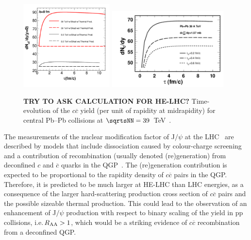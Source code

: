 \documentclass[../report.tex]{subfiles}
\begin{document}
\begin{figure}[!t]
\begin{center}
\includegraphics[width=0.42\textwidth]{helhc/figs/charmZhou.pdf}
\hfill
\includegraphics[width=0.54\textwidth]{helhc/figs/charmKo.pdf}
\caption{{\bf TRY TO ASK CALCULATION FOR HE-LHC?}  Time-evolution of the $c\overline c$ yield
  (per unit of rapidity at midrapidity) for central Pb--Pb collisions
  at $\sqrtsNN=39$~TeV~\cite{Zhou:2016wbo,Liu:2016zle}.}
\label{fig:thermalcharm}
\end{center}
\end{figure}




The measurements of the nuclear modification factor of J$/\psi$ at the LHC~\cite{Adam:2015isa,Adam:2015rba,Chatrchyan:2012np} 
are described by models that include dissociation caused by
colour-charge screening and a contribution of recombination
(usually denoted (re)generation) from deconfined $c$ and $\overline c$
quarks in the QGP~\cite{Liu:2009nb,Zhao:2011cv,Andronic:2011yq}. 
The (re)generation contribution is expected to be proportional to
the rapidity density of $c\overline c$ pairs in the QGP. 
Therefore, it is predicted to be much larger
at HE-LHC than LHC energies, as a consequence of the larger hard-scattering
production cross section of $c\overline c$ pairs and the possible 
sizeable thermal production.
This could lead to the observation of an enhancement of J$/\psi$
production with respect to binary scaling of the yield in pp
collisions, i.e.\,$R_{\rm AA}>1$, which would be a striking evidence of 
$c\overline c$ recombination from a deconfined QGP.
\end{document}

